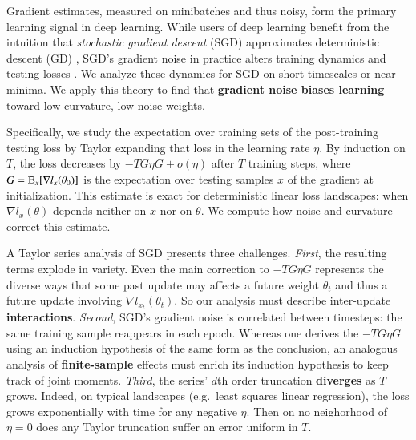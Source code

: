 
  Gradient estimates, measured on minibatches and thus noisy, form the primary
learning signal in deep learning.  While users of deep learning
benefit from the intuition that \emph{stochastic gradient descent} (SGD)
approximates deterministic descent (GD) \citep{bo91,le15}, SGD's gradient noise
in practice alters training dynamics and testing losses \citep{go18,wu20}.  We
analyze these dynamics for SGD on short timescales or near minima.  We apply
this theory to find that \textbf{gradient noise biases
learning} toward low-curvature, low-noise weights.%

  Specifically, we study the expectation over training sets of the
post-training testing loss by Taylor expanding that loss in the learning rate
$\eta$.  By induction on $T$, the loss decreases by $-T G\eta G + o(\eta)$
after $T$ training steps, where $G=\mathbb{E}_x[\nabla l_x(\theta_0)]$ is the
expectation over testing samples $x$ of the gradient at initialization.
%
This estimate is exact for deterministic linear loss landscapes:
when $\nabla l_x(\theta)$ depends neither on $x$ nor on $\theta$.  We compute
how noise and curvature correct this estimate.

  A Taylor series analysis of SGD presents three challenges.
%
\emph{First}, the resulting terms explode in variety.  Even the main
correction to $-T G\eta G$ represents the diverse ways that some past
update may affects a future weight $\theta_t$ and thus a future update
involving $\nabla l_{x_t}(\theta_t)$.  So our analysis must describe
inter-update \textbf{interactions}.
%
\emph{Second}, SGD's gradient noise is correlated between timesteps: %
the
same training sample reappears in each epoch.  Whereas one derives the $-T
G\eta G$ using an induction hypothesis of the same form as the conclusion, an
analogous analysis of \textbf{finite-sample} effects must enrich its
induction hypothesis to keep track of joint moments.  
%
\emph{Third}, the series' $d$th order truncation 
\textbf{diverges} as $T$ grows.  Indeed, on typical landscapes (e.g.\ least
squares linear regression), the loss grows exponentially with time for any
negative $\eta$.  Then on no neighorhood of $\eta=0$ does
any Taylor truncation suffer an error uniform in $T$. 

